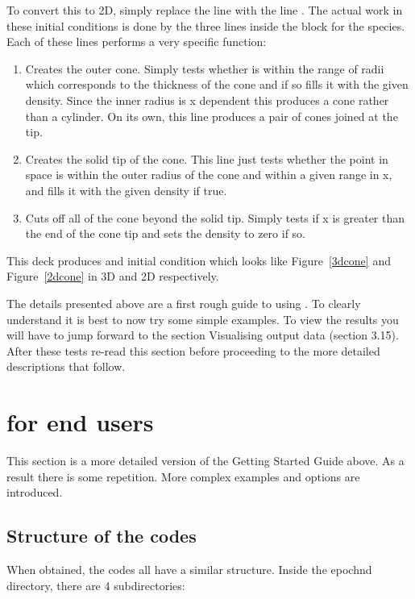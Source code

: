 To convert this to 2D, simply replace the line
 with the line . The
actual work in these initial conditions is done by the three lines inside the
block for the  species. Each of these lines performs a very
specific function:

\begin{enumerate}
\item Creates the outer cone. Simply tests whether  is within
  the range of radii which corresponds to the thickness of the cone and if so
  fills it with the given density. Since the inner radius is x dependent this
  produces a cone rather than a cylinder. On its own, this line produces a
  pair of cones joined at the tip.
\item Creates the solid tip of the cone. This line just tests whether the
  point in space is within the outer radius of the cone and within a given
  range in x, and fills it with the given density if true.
\item Cuts off all of the cone beyond the solid tip. Simply tests if x is
  greater than the end of the cone tip and sets the density to zero if so.
\end{enumerate}


This deck produces and initial condition which looks like Figure~\ref{3dcone}
and Figure~\ref{2dcone} in 3D and 2D respectively.

The details presented above are a first rough guide to using {\EPOCH}. To
clearly understand {\EPOCH} it is best to now try some simple examples. To
view the results you will have to jump forward to the section
Visualising {\EPOCH} output data (section 3.15). After these tests re-read
this section before proceeding to the more detailed descriptions that follow.


\clearpage

\section{{\EPOCH} for end users}
This section is a more detailed version of the Getting Started Guide above. As
a result there is some repetition. More complex examples and options are
introduced.
\label{sec:endusers}

\subsection{Structure of the {\EPOCH} codes}
When obtained, the {\EPOCH} codes all have a similar structure. Inside the
epoch{n}d directory, there are 4 subdirectories:

